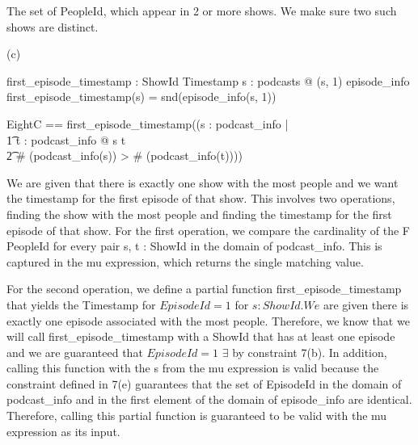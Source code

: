 \documentclass[a4paper,10pt,fleqn]{article}
\begin{document}
\setlength{\leftskip}{\dimexpr\parindent+2em\relax}
\noindent The set of PeopleId, which appear in 2 or more shows.  We make sure two such shows are distinct.

\bigskip

\setlength{\leftskip}{0pt}
\medskip

\noindent\hspace*{\parindent}(c) \begin{axdef}
first\_episode\_timestamp : ShowId \pfun Timestamp
\where
\forall s : podcasts @ (s, 1) \in \dom episode\_info \implies first\_episode\_timestamp(s) = snd(episode\_info(s, 1))
\end{axdef}


\bigskip

\setlength{\leftskip}{\dimexpr\parindent+2em\relax}
\begin{zed}
EightC == first\_episode\_timestamp((\mu s : \dom podcast\_info | \\
\t1 \forall t : \dom podcast\_info @ s \neq t \land \\
\t2 \# (podcast\_info(s)) > \# (podcast\_info(t))))
\end{zed}

\noindent We are given that there is exactly one show with the most people and we want the timestamp for the first episode of that show. This involves two operations, finding the show with the most people and finding the timestamp for the first episode of that show.  For the first operation, we compare the cardinality of the F PeopleId for every pair s, t : ShowId in the domain of podcast\_info. This is captured in the mu expression, which returns the single matching value.

\bigskip

\noindent For the second operation, we define a partial function first\_episode\_timestamp that yields the Timestamp for $EpisodeId = 1$ for $s : ShowId.  We$ are given there is exactly one episode associated with the most people. Therefore, we know that we will call first\_episode\_timestamp with a ShowId that has at least one episode and we are guaranteed that $EpisodeId = 1$ $\exists$ by constraint 7(b). In addition, calling this function with the s from the mu expression is valid because the constraint defined in 7(e) guarantees that the set of EpisodeId in the domain of podcast\_info and in the first element of the domain of episode\_info are identical. Therefore, calling this partial function is guaranteed to be valid with the mu expression as its input.
\end{document}
